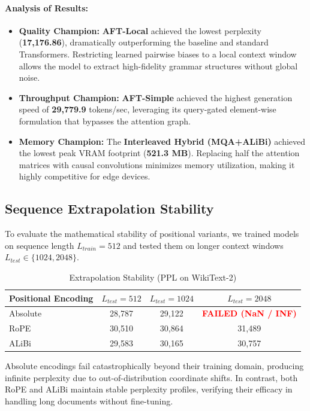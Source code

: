 \documentclass[11pt,a4paper]{article}
\begin{document}
\paragraph{Analysis of Results:}
\begin{itemize}
    \item \textbf{Quality Champion:} \textbf{AFT-Local} achieved the lowest perplexity (\textbf{17,176.86}), dramatically outperforming the baseline and standard Transformers. Restricting learned pairwise biases to a local context window allows the model to extract high-fidelity grammar structures without global noise.
    \item \textbf{Throughput Champion:} \textbf{AFT-Simple} achieved the highest generation speed of \textbf{29,779.9} tokens/sec, leveraging its query-gated element-wise formulation that bypasses the attention graph.
    \item \textbf{Memory Champion:} The \textbf{Interleaved Hybrid (MQA+ALiBi)} achieved the lowest peak VRAM footprint (\textbf{521.3 MB}). Replacing half the attention matrices with causal convolutions minimizes memory utilization, making it highly competitive for edge devices.
\end{itemize}

\subsection{Sequence Extrapolation Stability}
To evaluate the mathematical stability of positional variants, we trained models on sequence length $L_{train}=512$ and tested them on longer context windows $L_{test} \in \{1024, 2048\}$.

\begin{table}[!ht]
    \centering
    \caption{Extrapolation Stability (PPL on WikiText-2)}
    \label{tab:extrapolation_results}
    \begin{tabular}{lccc}
        \toprule
        \textbf{Positional Encoding} & $L_{test} = 512$ & $L_{test} = 1024$ & $L_{test} = 2048$ \\
        \midrule
        Absolute & 28,787 & 29,122 & \textcolor{red}{\textbf{FAILED (NaN / INF)}} \\
        RoPE     & 30,510 & 30,864 & 31,489 \\
        ALiBi    & 29,583 & 30,165 & 30,757 \\
        \bottomrule
    \end{tabular}
\end{table}

Absolute encodings fail catastrophically beyond their training domain, producing infinite perplexity due to out-of-distribution coordinate shifts. In contrast, both RoPE and ALiBi maintain stable perplexity profiles, verifying their efficacy in handling long documents without fine-tuning.
\end{document}
